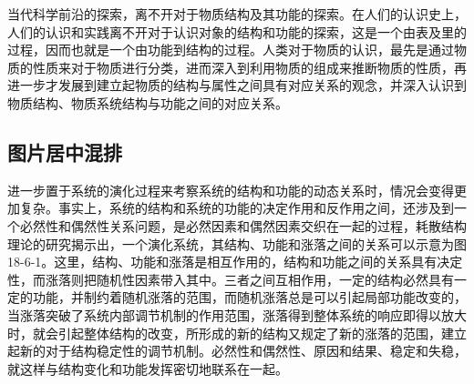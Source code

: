 \documentclass{article}
\begin{document}
当代科学前沿的探索，离不开对于物质结构及其功能的探索。在人们的认识史上，人们的认识和实践离不开对于认识对象的结构和功能的探索，这是一个由表及里的过程，因而也就是一个由功能到结构的过程。人类对于物质的认识，最先是通过物质的性质来对于物质进行分类，进而深入到利用物质的组成来推断物质的性质，再进一步才发展到建立起物质的结构与属性之间具有对应关系的观念，并深入认识到物质结构、物质系统结构与功能之间的对应关系。


\subsection{图片居中混排}
\begin{window}
  进一步置于系统的演化过程来考察系统的结构和功能的动态关系时，情况会变得更加复杂。事实上，系统的结构和系统的功能的决定作用和反作用之间，还涉及到一个必然性和偶然性关系问题，是必然因素和偶然因素交织在一起的过程，耗散结构理论的研究揭示出，一个演化系统，其结构、功能和涨落之间的关系可以示意为图18-6-1。这里，结构、功能和涨落是相互作用的，结构和功能之间的关系具有决定性，而涨落则把随机性因素带入其中。三者之间互相作用，一定的结构必然具有一定的功能，并制约着随机涨落的范围，而随机涨落总是可以引起局部功能改变的，当涨落突破了系统内部调节机制的作用范围，涨落得到整体系统的响应即得以放大时，就会引起整体结构的改变，所形成的新的结构又规定了新的涨落的范围，建立起新的对于结构稳定性的调节机制。必然性和偶然性、原因和结果、稳定和失稳，就这样与结构变化和功能发挥密切地联系在一起。
\end{window}
\end{document}

